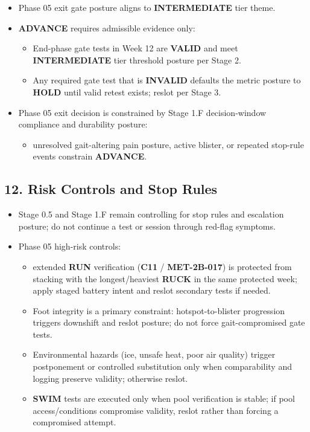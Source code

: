 \documentclass[10pt]{article}
\begin{document}
\begin{itemize}
\item Phase 05 exit gate posture aligns to \textbf{INTERMEDIATE} tier theme.
\item \textbf{ADVANCE} requires admissible evidence only:
\begin{itemize}
\item End-phase gate tests in Week 12 are \textbf{VALID} and meet \textbf{INTERMEDIATE} tier threshold posture per Stage 2.
\item Any required gate test that is \textbf{INVALID} defaults the metric posture to \textbf{HOLD} until valid retest exists; reslot per Stage 3.
\end{itemize}
\item Phase 05 exit decision is constrained by Stage 1.F decision-window compliance and durability posture:
\begin{itemize}
\item unresolved gait-altering pain posture, active blister, or repeated stop-rule events constrain \textbf{ADVANCE}.
\end{itemize}
\end{itemize}

\subsection*{12. Risk Controls and Stop Rules}

\begin{itemize}
\item Stage 0.5 and Stage 1.F remain controlling for stop rules and escalation posture; do not continue a test or session through red-flag symptoms.
\item Phase 05 high-risk controls:
\begin{itemize}
\item extended \textbf{RUN} verification (\textbf{C11} / \textbf{MET-2B-017}) is protected from stacking with the longest/heaviest \textbf{RUCK} in the same protected week; apply staged battery intent and reslot secondary tests if needed.
\item Foot integrity is a primary constraint: hotspot-to-blister progression triggers downshift and reslot posture; do not force gait-compromised gate tests.
\item Environmental hazards (ice, unsafe heat, poor air quality) trigger postponement or controlled substitution only when comparability and logging preserve validity; otherwise reslot.
\item \textbf{SWIM} tests are executed only when pool verification is stable; if pool access/conditions compromise validity, reslot rather than forcing a compromised attempt.
\end{itemize}
\end{itemize}
\end{document}
